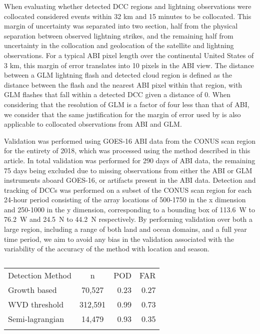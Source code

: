 When evaluating whether detected DCC regions and lightning observations were collocated \citet{muller_novel_2019} considered events within 32 \unit{km} and 15 minutes to be collocated.
This margin of uncertainty was separated into two section, half from the physical separation between observed lightning strikes, and the remaining half from uncertainty in the collocation and geolocation of the satellite and lightning observations.
For a typical ABI pixel length over the continental United States of 3 \unit{km}, this margin of error translates into 10 pixels in the ABI view.
The distance between a GLM lightning flash and detected cloud region is defined as the distance between the flash and the nearest ABI pixel within that region, with GLM flashes that fall within a detected DCC given a distance of 0.
When considering that the resolution of GLM is a factor of four less than that of ABI, we consider that the same justification for the margin of error used by \citet{muller_novel_2019} is also applicable to collocated observations from ABI and GLM.

Validation was performed using GOES-16 ABI data from the CONUS scan region for the entirety of 2018, which was processed using the method described in this article.
In total validation was performed for 290 days of ABI data, the remaining 75 days being excluded due to missing observations from either the ABI or GLM instruments aboard GOES-16, or artifacts present in the ABI data.
Detection and tracking of DCCs was performed on a subset of the CONUS scan region for each 24-hour period consisting of the array locations of 500-1750 in the x dimension and 250-1000 in the y dimension, corresponding to a bounding box of 113.6~\degree W to 76.2~\degree W and 24.5~\degree N to 44.2~\degree N respectively.
By performing validation over both a large region, including a range of both land and ocean domains, and a full year time period, we aim to avoid any bias in the validation associated with the variability of the accuracy of the method with location and season.

\begin{table}[t]
\caption{}
\label{table:validation}
\begin{tabular}{lcrr}
\tophline
Detection Method    & n         & POD       & FAR       \\ 
\middlehline
Growth based        & 70,527    & 0.23      & 0.27      \\
WVD threshold       & 312,591   & 0.99      & 0.73      \\
Semi-lagrangian     & 14,479    & 0.93      & 0.35      \\
\bottomhline
\end{tabular}
\end{table}


